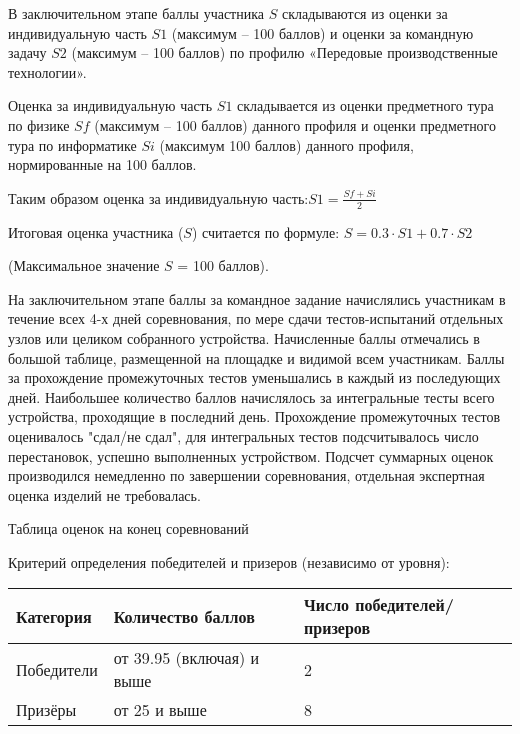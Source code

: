 В заключительном этапе баллы участника $S$ складываются из оценки за индивидуальную часть $S1$ (максимум – 100 баллов) и оценки за командную задачу $S2$ (максимум – 100 баллов) по профилю «Передовые производственные технологии».

Оценка за индивидуальную часть $S1$ складывается из оценки предметного тура по физике $Sf$ (максимум – 100 баллов) данного профиля и оценки предметного тура по информатике $Si$ (максимум 100 баллов) данного профиля, нормированные на 100 баллов.

Таким образом оценка за индивидуальную часть:$ S1 = \frac{Sf + Si}{2}$

Итоговая оценка участника ($S$) считается по формуле: $S = 0.3 \cdot S1 + 0.7 \cdot S2$

(Максимальное значение $S$ = 100 баллов).

На заключительном этапе баллы за командное задание начислялись участникам в течение всех 4-х дней соревнования, по мере сдачи тестов-испытаний отдельных узлов или целиком собранного устройства. Начисленные баллы отмечались в большой таблице, размещенной на площадке и видимой всем участникам.   Баллы за прохождение промежуточных тестов уменьшались в каждый из последующих дней.  Наибольшее количество баллов начислялось за интегральные тесты всего устройства, проходящие в последний день.  Прохождение промежуточных тестов оценивалось "сдал/не сдал", для интегральных тестов подсчитывалось число перестановок, успешно выполненных устройством. Подсчет суммарных оценок производился немедленно по завершении соревнования, отдельная экспертная оценка изделий не требовалась.

\begin{center}
    Таблица оценок на конец соревнований
\end{center}


Критерий определения победителей и призеров (независимо от уровня):
\begin{center}
    \begin{tabular}{|l|l|l|}
        \hline
        Категория&Количество баллов&Число победителей/призеров\\
        \hline
        Победители & от 39.95 (включая) и выше & 2\\
        \hline
        Призёры & от 25 и выше & 8 \\
        \hline
    \end{tabular}
\end{center}